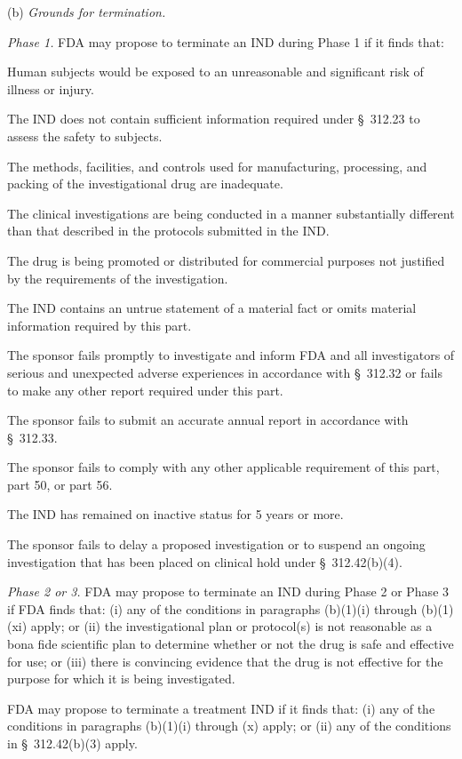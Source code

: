 (b) \textit{Grounds for termination.}

\begin{description}[leftmargin=0.5cm,style=sameline]
\item[(1)] \textit{Phase 1.} FDA may propose to terminate an IND during Phase 1 if it finds that:
\begin{description}[leftmargin=0.8cm,style=sameline]
\item[(i)] Human subjects would be exposed to an unreasonable and significant risk of illness or injury.
\item[(ii)] The IND does not contain sufficient information required under \S~312.23 to assess the safety to subjects.
\item[(iii)] The methods, facilities, and controls used for manufacturing, processing, and packing of the investigational drug are inadequate.
\item[(iv)] The clinical investigations are being conducted in a manner substantially different than that described in the protocols submitted in the IND.
\item[(v)] The drug is being promoted or distributed for commercial purposes not justified by the requirements of the investigation.
\item[(vi)] The IND contains an untrue statement of a material fact or omits material information required by this part.
\item[(vii)] The sponsor fails promptly to investigate and inform FDA and all investigators of serious and unexpected adverse experiences in accordance with \S~312.32 or fails to make any other report required under this part.
\item[(viii)] The sponsor fails to submit an accurate annual report in accordance with \S~312.33.
\item[(ix)] The sponsor fails to comply with any other applicable requirement of this part, part 50, or part 56.
\item[(x)] The IND has remained on inactive status for 5 years or more.
\item[(xi)] The sponsor fails to delay a proposed investigation or to suspend an ongoing investigation that has been placed on clinical hold under \S~312.42(b)(4).
\end{description}

\item[(2)] \textit{Phase 2 or 3.} FDA may propose to terminate an IND during Phase 2 or Phase 3 if FDA finds that: (i) any of the conditions in paragraphs (b)(1)(i) through (b)(1)(xi) apply; or (ii) the investigational plan or protocol(s) is not reasonable as a bona fide scientific plan to determine whether or not the drug is safe and effective for use; or (iii) there is convincing evidence that the drug is not effective for the purpose for which it is being investigated.

\item[(3)] FDA may propose to terminate a treatment IND if it finds that: (i) any of the conditions in paragraphs (b)(1)(i) through (x) apply; or (ii) any of the conditions in \S~312.42(b)(3) apply.
\end{description}

